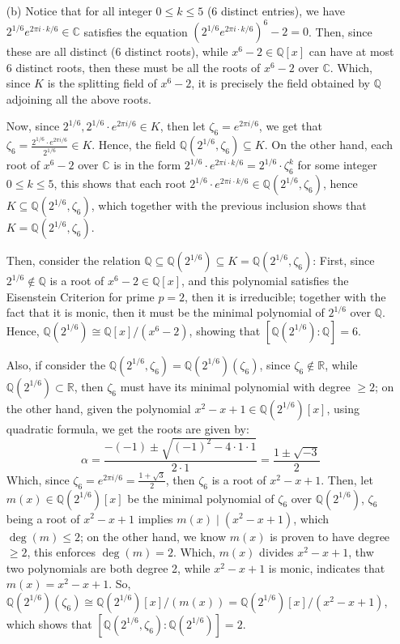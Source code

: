 \documentclass{article}
\begin{document}
\begin{itemize}
    \item[(b)] Notice that for all integer $0\leq k\leq 5$ ($6$ distinct entries), we have $2^{1/6}e^{2\pi i\cdot k/6}\in\mathbb{C}$ satisfies the equation $(2^{1/6}e^{2\pi i\cdot k/6})^6 -2 = 0$. Then, since these are all distinct ($6$ distinct roots), while $x^6-2\in\mathbb{Q}[x]$ can have at most $6$ distinct roots, then these must be all the roots of $x^6-2$ over $\mathbb{C}$. Which, since $K$ is the splitting field of $x^6-2$, it is precisely the field obtained by $\mathbb{Q}$ adjoining all the above roots.
    
    Now, since $2^{1/6},2^{1/6}\cdot e^{2\pi i/6}\in K$, then let $\zeta_6 = e^{2\pi i/6}$, we get that $\zeta_6 = \frac{2^{1/6}\cdot e^{2\pi i/6}}{2^{1/6}}\in K$. Hence, the field $\mathbb{Q}(2^{1/6},\zeta_6)\subseteq K$. On the other hand, each root of $x^6-2$ over $\mathbb{C}$ is in the form $2^{1/6}\cdot e^{2\pi i\cdot k/6} = 2^{1/6}\cdot \zeta_6^k$ for some integer $0\leq k\leq 5$, this shows that each root $2^{1/6}\cdot e^{2\pi i\cdot k/6}\in \mathbb{Q}(2^{1/6},\zeta_6)$, hence $K\subseteq\mathbb{Q}(2^{1/6},\zeta_6)$, which together with the previous inclusion shows that $K = \mathbb{Q}(2^{1/6},\zeta_6)$.

    Then, consider the relation $\mathbb{Q}\subseteq \mathbb{Q}(2^{1/6})\subseteq K=\mathbb{Q}(2^{1/6},\zeta_6)$: First, since $2^{1/6}\notin \mathbb{Q}$ is a root of $x^6-2\in\mathbb{Q}[x]$, and this polynomial satisfies the Eisenstein Criterion for prime $p=2$, then it is irreducible; together with the fact that it is monic, then it must be the minimal polynomial of $2^{1/6}$ over $\mathbb{Q}$. Hence, $\mathbb{Q}(2^{1/6})\cong \mathbb{Q}[x]/(x^6-2)$, showing that $[\mathbb{Q}(2^{1/6}):\mathbb{Q}]=6$.

    Also, if consider the $\mathbb{Q}(2^{1/6},\zeta_6)=\mathbb{Q}(2^{1/6})(\zeta_6)$, since $\zeta_6\notin\mathbb{R}$, while $\mathbb{Q}(2^{1/6})\subset \mathbb{R}$, then $\zeta_6$ must have its minimal polynomial with degree $\geq 2$; on the other hand, given the polynomial $x^2-x+1\in\mathbb{Q}(2^{1/6})[x]$, using quadratic formula, we get the roots are given by:
    $$\alpha = \frac{-(-1)\pm\sqrt{(-1)^2-4\cdot 1\cdot 1}}{2\cdot 1} = \frac{1\pm\sqrt{-3}}{2}$$
    Which, since $\zeta_6 = e^{2\pi i/6} = \frac{1+\sqrt{3}}{2}$, then $\zeta_6$ is a root of $x^2-x+1$. Then, let $m(x)\in\mathbb{Q}(2^{1/6})[x]$ be the minimal polynomial of $\zeta_6$ over $\mathbb{Q}(2^{1/6})$, $\zeta_6$ being a root of $x^2-x+1$ implies $m(x)\mid (x^2-x+1)$, which $\deg(m)\leq 2$; on the other hand, we know $m(x)$ is proven to have degree $\geq 2$, this enforces $\deg(m)=2$. Which, $m(x)$ divides $x^2-x+1$, thw two polynomials are both degree 2, while $x^2-x+1$ is monic, indicates that $m(x)=x^2-x+1$.
    So, $\mathbb{Q}(2^{1/6})(\zeta_6) \cong \mathbb{Q}(2^{1/6})[x]/(m(x))=\mathbb{Q}(2^{1/6})[x]/(x^2-x+1)$, which shows that $[\mathbb{Q}(2^{1/6},\zeta_6):\mathbb{Q}(2^{1/6})]=2$.


\end{itemize}
\end{document}
